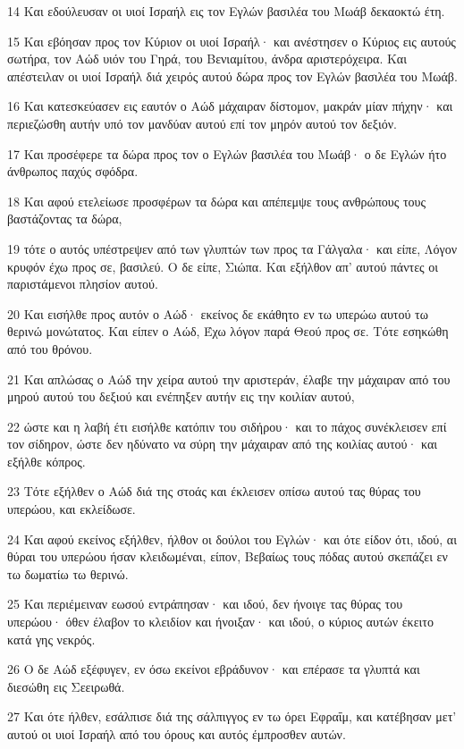 \par 14 Και εδούλευσαν οι υιοί Ισραήλ εις τον Εγλών βασιλέα του Μωάβ δεκαοκτώ έτη.
\par 15 Και εβόησαν προς τον Κύριον οι υιοί Ισραήλ· και ανέστησεν ο Κύριος εις αυτούς σωτήρα, τον Αώδ υιόν του Γηρά, του Βενιαμίτου, άνδρα αριστερόχειρα. Και απέστειλαν οι υιοί Ισραήλ διά χειρός αυτού δώρα προς τον Εγλών βασιλέα του Μωάβ.
\par 16 Και κατεσκεύασεν εις εαυτόν ο Αώδ μάχαιραν δίστομον, μακράν μίαν πήχην· και περιεζώσθη αυτήν υπό τον μανδύαν αυτού επί τον μηρόν αυτού τον δεξιόν.
\par 17 Και προσέφερε τα δώρα προς τον ο Εγλών βασιλέα του Μωάβ· ο δε Εγλών ήτο άνθρωπος παχύς σφόδρα.
\par 18 Και αφού ετελείωσε προσφέρων τα δώρα και απέπεμψε τους ανθρώπους τους βαστάζοντας τα δώρα,
\par 19 τότε ο αυτός υπέστρεψεν από των γλυπτών των προς τα Γάλγαλα· και είπε, Λόγον κρυφόν έχω προς σε, βασιλεύ. Ο δε είπε, Σιώπα. Και εξήλθον απ' αυτού πάντες οι παριστάμενοι πλησίον αυτού.
\par 20 Και εισήλθε προς αυτόν ο Αώδ· εκείνος δε εκάθητο εν τω υπερώω αυτού τω θερινώ μονώτατος. Και είπεν ο Αώδ, Έχω λόγον παρά Θεού προς σε. Τότε εσηκώθη από του θρόνου.
\par 21 Και απλώσας ο Αώδ την χείρα αυτού την αριστεράν, έλαβε την μάχαιραν από του μηρού αυτού του δεξιού και ενέπηξεν αυτήν εις την κοιλίαν αυτού,
\par 22 ώστε και η λαβή έτι εισήλθε κατόπιν του σιδήρου· και το πάχος συνέκλεισεν επί τον σίδηρον, ώστε δεν ηδύνατο να σύρη την μάχαιραν από της κοιλίας αυτού· και εξήλθε κόπρος.
\par 23 Τότε εξήλθεν ο Αώδ διά της στοάς και έκλεισεν οπίσω αυτού τας θύρας του υπερώου, και εκλείδωσε.
\par 24 Και αφού εκείνος εξήλθεν, ήλθον οι δούλοι του Εγλών· και ότε είδον ότι, ιδού, αι θύραι του υπερώου ήσαν κλειδωμέναι, είπον, Βεβαίως τους πόδας αυτού σκεπάζει εν τω δωματίω τω θερινώ.
\par 25 Και περιέμειναν εωσού εντράπησαν· και ιδού, δεν ήνοιγε τας θύρας του υπερώου· όθεν έλαβον το κλειδίον και ήνοιξαν· και ιδού, ο κύριος αυτών έκειτο κατά γης νεκρός.
\par 26 Ο δε Αώδ εξέφυγεν, εν όσω εκείνοι εβράδυνον· και επέρασε τα γλυπτά και διεσώθη εις Σεειρωθά.
\par 27 Και ότε ήλθεν, εσάλπισε διά της σάλπιγγος εν τω όρει Εφραΐμ, και κατέβησαν μετ' αυτού οι υιοί Ισραήλ από του όρους και αυτός έμπροσθεν αυτών.
